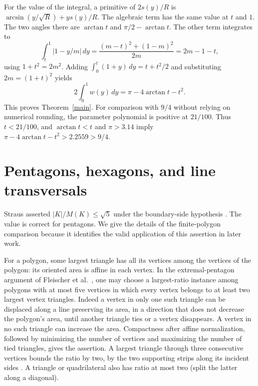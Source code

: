 \documentclass[11pt]{article}
\newcommand{\area}[1]{\lvert #1\rvert}
\begin{document}
For the value of the integral, a primitive of $2s(y)/R$ is
$\arcsin(y/\sqrt R)+ys(y)/R$. The algebraic term has the same value
at $t$ and $1$. The two angles there are $\arctan t$ and
$\pi/2-\arctan t$. The other term integrates to
\[
 \int_t^1 |1-y/m|\,dy
 =\frac{(m-t)^2+(1-m)^2}{2m}
 = 2m-1-t,
\]
using $1+t^2=2m^2$. Adding $\int_0^t(1+y)\,dy=t+t^2/2$
and substituting $2m=(1+t)^2$ yields
\[
 2\int_0^1w(y)\,dy=\pi-4\arctan t-t^2.
\]
This proves Theorem~\ref{main}. For comparison with $9/4$ without relying
on numerical rounding, the parameter polynomial is positive at $21/100$.
Thus $t<21/100$, and $\arctan t<t$ and $\pi>3.14$ imply
$\pi-4\arctan t-t^2>2.2559>9/4$.

\section{Pentagons, hexagons, and line transversals}\label{history}

Straus asserted $\area K/M(K)\le\sqrt5$ under the boundary-side
hypothesis \cite[Lemma 2, p.~309]{Straus}. The value is correct for
pentagons. We give the details of the finite-polygon comparison because
it identifies the valid application of this assertion in later work.

For a polygon, some largest triangle has all its vertices among the
vertices of the polygon: its oriented area is affine in each vertex.
In the extremal-pentagon argument of Fleischer et al.\ \cite[Lemmas
A.1--A.4 and the proof of Theorem A.6]{FMRWY}, one may choose a
largest-ratio instance among polygons with at most five vertices in
which every vertex belongs to at least two largest vertex triangles.
Indeed a vertex in only one such triangle can be displaced along a line
preserving its area, in a direction that does not decrease the
polygon's area, until another triangle ties or a vertex disappears.
A vertex in no such triangle can increase the area. Compactness after
affine normalization, followed by minimizing the number of vertices
and maximizing the number of tied triangles, gives the assertion.
A largest triangle through three consecutive vertices bounds the
ratio by two, by the two supporting strips along its incident sides
\cite[Lemma A.2]{FMRWY}. A triangle or quadrilateral also has ratio
at most two (split the latter along a diagonal).
\end{document}
